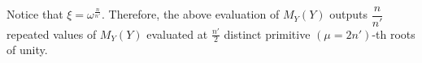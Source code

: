 $ $

Notice that $\xi = \omega^{\frac{n}{n'}}$. Therefore, the above evaluation of $M_Y(Y)$ outputs $\dfrac{n}{n'}$ repeated values of $M_Y(Y)$ evaluated at $\frac{n'}{2}$ distinct primitive $(\mu=2n')$-th roots of unity. 

